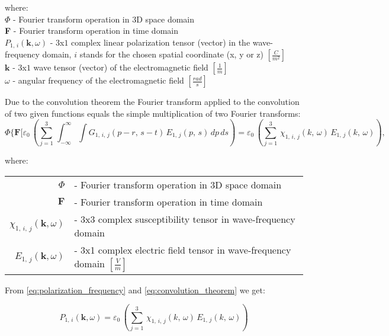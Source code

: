 \documentclass[12pt,twoside,a4paper]{article}
\def\emptyline{\vspace{12pt}}
\numberwithin{equation}{subsection}
\numberwithin{figure}{subsection}
\begin{document}
where: \\
$\Phi $ - Fourier transform operation in $3$D space domain \\
\textbf{F} - Fourier transform operation in time domain \\
${P_{1, \,i}} (\textbf{k},\omega )$ - $3$x$1$ complex linear polarization tensor (vector) in the wave-frequency domain, 
$i$ stands for the chosen spatial coordinate (x, y or z) $[\frac {C}{m^{2}}]$ \\
$\textbf{k}$ - $3$x$1$ wave tensor (vector) of the electromagnetic field $[\frac {1}{m}]$ \\
$\omega $ - angular frequency of the electromagnetic field $[\frac {rad}{s}]$


Due to the convolution theorem \cite{katznelson_introduction} the Fourier transform applied to the convolution of two given
functions equals the simple multiplication of two Fourier transforms:
\begin{equation} \label{eq:convolution_theorem}
  \Phi \textbf{\{F}[ {\varepsilon_{0}}\, \left(  \! \sum_{j=1}^{3}\,\int_{ - \infty }^{\infty }
    \int {G_{1, \,i, \,j}}(p - r, \,s - t)\,{E_{1, \,j}}(p, \,s)\,dp\,ds \!  \right) =
    {\varepsilon_{0}}\,(\sum_{j=1}^{3}\,{\chi_{1, \,i, \,j}}(k, \,\omega )\,{E_{1, \,j}}(k, \,\omega )),
\end{equation}

where: 

\begin{tabular}{r l}
  $\Phi $ & - Fourier transform operation in $3$D space domain \\
  $\textbf{F}$ & - Fourier transform operation in time domain \\
  ${\chi_{1, \,i, \,j}} (\textbf{k},\omega) $ & - 3x3 complex susceptibility tensor in wave-frequency domain
  \cite{fakiszscan} \\ ${E_{1, \,j}} (\textbf{k}, \omega) $ & - 3x1 complex electric field tensor in wave-frequency
  domain $[\frac {V}{m}]$ \\
\end{tabular}


\emptyline


From \ref{eq:polarization_frequency} and \ref{eq:convolution_theorem} we get:

\begin{equation} \label{eq:final_linpolarization}
  {P_{1, \,i}}  (\textbf{k}, \omega) = {\varepsilon_{0}}\,(\sum_{j=1}^{3}\,{\chi_{1, \,i, \,j}}(k,\,\omega )\,{E_{1, \,j}}(k, \,\omega ))
\end{equation}
\end{document}
